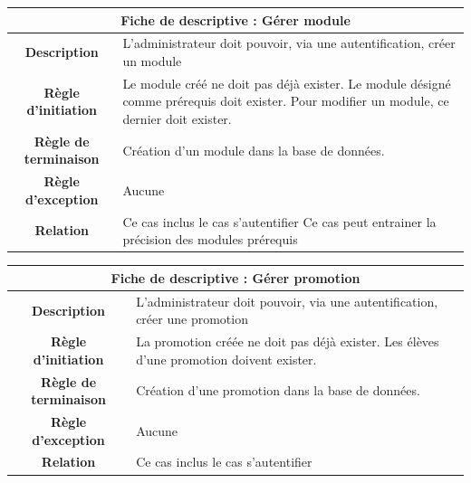 \documentclass[10pt,a4paper,titlepage]{report}
\begin{document}
		\begin{tabular}{|c|p{8cm}|}
	\hline 
	\multicolumn{2}{|c|}{\textbf{Fiche de descriptive : Gérer module}} \\ 
	\hline 
	\textbf{Description} & L'administrateur doit pouvoir, via une autentification, créer un module \\  
	\hline
	\textbf{Règle d'initiation} & Le module créé ne doit pas déjà exister.
                Le module désigné comme prérequis doit exister.
                Pour modifier un module, ce dernier doit exister. \\ 
	\hline 
	\textbf{Règle de terminaison} & Création d'un module dans la base de données. \\ 
	\hline 
	\textbf{Règle d'exception} & Aucune \\ 
	\hline 
	\textbf{Relation} & Ce cas inclus le cas s'autentifier
				Ce cas peut entrainer la précision des modules prérequis
 \\ 
	\hline 
	\end{tabular}\newline \newline \newline
	\begin{tabular}{|c|p{8cm}|}
	\hline 
	\multicolumn{2}{|c|}{\textbf{Fiche de descriptive : Gérer promotion}} \\ 
	\hline 
	\textbf{Description} & L'administrateur doit pouvoir, via une autentification, créer une promotion \\  
	\hline
	\textbf{Règle d'initiation} &  La promotion créée ne doit pas déjà exister.
                Les élèves d'une promotion doivent exister. \\ 
	\hline 
	\textbf{Règle de terminaison} & Création d'une promotion dans la base de données. \\ 
	\hline 
	\textbf{Règle d'exception} & Aucune \\ 
	\hline 
	\textbf{Relation} & Ce cas inclus le cas s'autentifier
 \\ 
	\hline 
	\end{tabular} \\  
	\newpage
\end{document}
